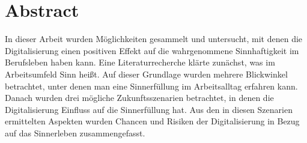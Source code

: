 \chapter*{Abstract}
In dieser Arbeit wurden Möglichkeiten gesammelt und untersucht, mit denen die Digitalisierung einen positiven Effekt auf die wahrgenommene Sinnhaftigkeit im Berufsleben haben kann. Eine Literaturrecherche klärte zunächst, was im Arbeitsumfeld Sinn heißt. Auf dieser Grundlage wurden mehrere Blickwinkel betrachtet, unter denen man eine Sinnerfüllung im Arbeitsalltag erfahren kann. Danach wurden drei mögliche Zukunftsszenarien betrachtet, in denen die Digitalisierung Einfluss auf die Sinnerfüllung hat. Aus den in diesen Szenarien ermittelten Aspekten wurden Chancen und Risiken der Digitalisierung in Bezug auf das Sinnerleben zusammengefasst.